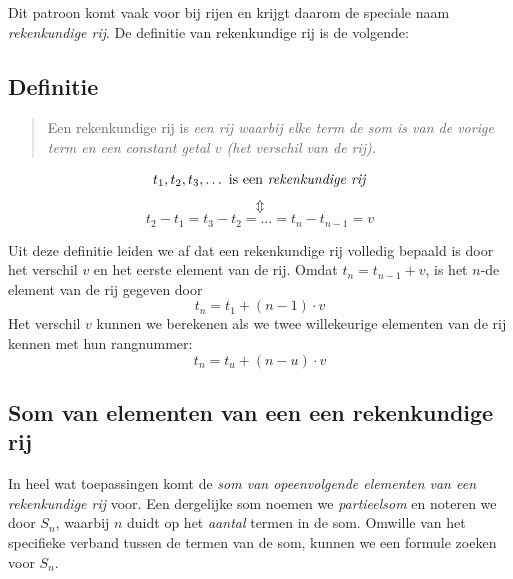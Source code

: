 Dit patroon komt vaak voor bij rijen en
krijgt daarom de speciale naam \textit{rekenkundige rij}. De definitie
van rekenkundige rij is de volgende:


\subsection{Definitie}
\begin{quote}
Een rekenkundige rij is \emph{een rij waarbij elke term de som is van de vorige term en een constant getal $v$ (het verschil van de rij).}
\end{quote}
\begin{displaymath}
   t_1, t_2, t_3, \dots  \mbox{ is een \emph{rekenkundige
    rij}}
\end{displaymath}
\begin{displaymath}
    \Updownarrow
\end{displaymath}
\begin{displaymath}
    t_{2}-t_{1}=t_{3}-t_{2}=\dots=t_{n}-t_{n-1} =v
\end{displaymath}

Uit deze definitie leiden we af dat een rekenkundige rij volledig bepaald is door het verschil $v$ en het eerste element van de rij. Omdat $t_n=t_{n-1}+v$, is het $n$-de element van de rij gegeven door 
    \begin{equation}
        t_{n}=t_{1}+(n-1)\cdot v
        \label{eq:algelementrr}
    \end{equation}
Het verschil $v$ kunnen we berekenen als we twee willekeurige elementen van de rij kennen met hun rangnummer:
\[
  t_{n}=t_{u}+(n-u)\cdot v
\]

\subsection{Som van elementen van een een rekenkundige rij}
In heel wat toepassingen komt de \emph{som
van opeenvolgende elementen van een rekenkundige rij} voor.  Een dergelijke som
noemen we \emph{par\-tieel\-som} en noteren we door $S_{n}$,
waarbij $n$ duidt op het \emph{aantal} termen in de som. Omwille van het specifieke verband tussen de termen van de som, kunnen we een formule zoeken voor $S_{n}$.

